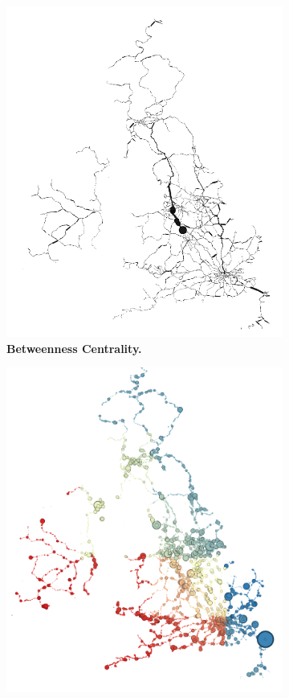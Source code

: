 \begin{figure}[H]
\begin{subfigure}[t]{.49\textwidth}
     \centering
         \includegraphics[width=\textwidth]{rail/betweenness.png}
        \caption{ \textbf{Betweenness Centrality.}}
\end{subfigure}
\begin{subfigure}[t]{.49\textwidth}
     \centering
          \includegraphics[width=\textwidth]{rail/pagerank.png}

\end{subfigure}
\end{figure}
